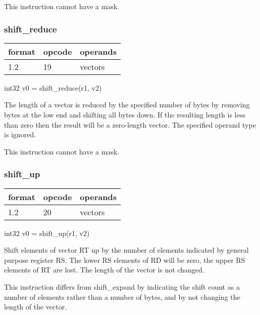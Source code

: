 \documentclass[forwardcom.tex]{subfiles}
\begin{document}
This instruction cannot have a mask.

\subsubsection{shift\_reduce}
\label{table:shiftReduceInstruction}
\begin{tabular}{|p{12mm}|p{12mm}|p{110mm}|}
\hline
\bfseries format & \bfseries opcode & \bfseries operands \\ \hline
1.2 & 19 & vectors \\ \hline
\end{tabular}
\vspace{2mm}

int32 v0 = shift\_reduce(r1, v2)
\vspace{2mm}

The length of a vector is reduced by the specified number of bytes by removing bytes at the low end and shifting all bytes down. If the resulting length is less than zero then the result will be a zero-length vector. The specified operand type is ignored.

\vspace{2mm}
This instruction cannot have a mask.

\subsubsection{shift\_up}
\label{table:shiftUpInstruction}
\begin{tabular}{|p{12mm}|p{12mm}|p{110mm}|}
\hline
\bfseries format & \bfseries opcode & \bfseries operands \\ \hline
1.2 & 20 & vectors \\ \hline
\end{tabular}
\vspace{2mm}

int32 v0 = shift\_up(r1, v2)
\vspace{2mm}

Shift elements of vector RT up by the number of elements indicated by general purpose register RS. 
The lower RS elements of RD will be zero, the upper RS elements of RT are lost. The length of the vector is not changed.
\vspace{2mm}

This instruction differs from shift\_expand by indicating the shift count as a number of elements rather than a number of bytes, and by not changing the length of the vector.
\vspace{2mm}
\end{document}
